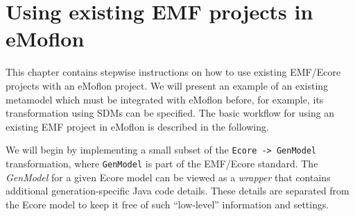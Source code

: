 \newpage

\chapter{Using existing EMF projects in eMoflon}
\genHeader

This chapter contains stepwise instructions on how to use existing \mbox{EMF}/Ecore projects with an eMoflon project.
We will present an example of an existing metamodel which must be integrated with eMoflon before, for example, its transformation using SDMs can be
specified. The basic workflow for using an existing EMF project in eMoflon is described in the following. 

We will begin by implementing a small subset of the \texttt{Ecore -> GenModel} transformation, where \texttt{GenModel} is part of the EMF/Ecore standard. The
\emph{GenModel} for a given Ecore model can be viewed as a \emph{wrapper} that contains additional generation-specific Java code details. These details are
separated from the Ecore model to keep it free of such ``low-level'' information and settings.




